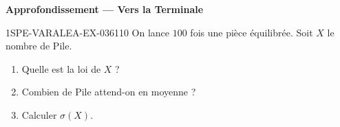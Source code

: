 \begin{center}\textbf{Approfondissement — Vers la Terminale}\end{center}
\begin{exercice}{1SPE-VARALEA-EX-036}{1}{10}
On lance $100$ fois une pièce équilibrée. Soit $X$ le nombre de Pile.

\begin{enumerate}
  \item Quelle est la loi de $X$ ?
  \item Combien de Pile attend-on en moyenne ?
  \item Calculer $\sigma(X)$.
\end{enumerate}
\end{exercice}
